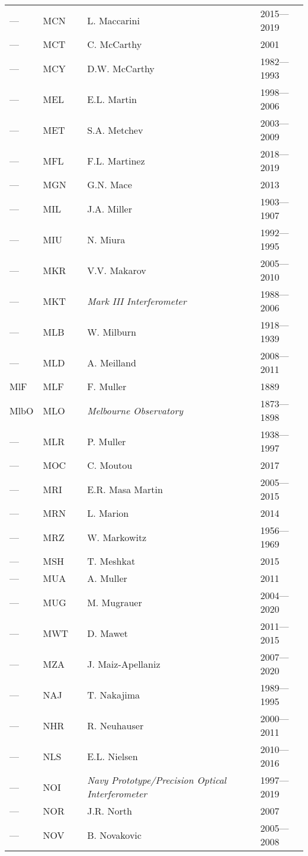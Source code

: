 \begin{longtable}{l|l|c|p{59mm}|l}
--- & MCN &   & L. Maccarini & 2015---2019 \\
--- & MCT &   & C. McCarthy & 2001 \\
--- & MCY &   & D.W. McCarthy & 1982---1993 \\
--- & MEL &   & E.L. Martin & 1998---2006 \\
--- & MET &   & S.A. Metchev & 2003---2009 \\
--- & MFL &   & F.L. Martinez & 2018---2019 \\
--- & MGN &   & G.N. Mace & 2013 \\
--- & MIL &   & J.A. Miller & 1903---1907 \\
--- & MIU &   & N. Miura & 1992---1995 \\
--- & MKR &   & V.V. Makarov & 2005---2010 \\
--- & MKT &   & \emph{Mark III Interferometer} & 1988---2006 \\
--- & MLB &   & W. Milburn & 1918---1939 \\
--- & MLD &   & A. Meilland & 2008---2011 \\
MlF & MLF &   & F. Muller & 1889 \\
MlbO & MLO &   & \emph{Melbourne Observatory} & 1873---1898 \\
--- & MLR &   & P. Muller & 1938---1997 \\
--- & MOC &   & C. Moutou & 2017 \\
--- & MRI &   & E.R. Masa Martin & 2005---2015 \\
--- & MRN &   & L. Marion & 2014 \\
--- & MRZ &   & W. Markowitz & 1956---1969 \\
--- & MSH &   & T. Meshkat & 2015 \\
--- & MUA &   & A. Muller & 2011 \\
--- & MUG &   & M. Mugrauer & 2004---2020 \\
--- & MWT &   & D. Mawet & 2011---2015 \\
--- & MZA &   & J. Maiz-Apellaniz & 2007---2020 \\\midrule
--- & NAJ &   & T. Nakajima & 1989---1995 \\
--- & NHR &   & R. Neuhauser & 2000---2011 \\
--- & NLS &   & E.L. Nielsen & 2010---2016 \\
--- & NOI &   & \emph{Navy Prototype/Precision Optical Interferometer} & 1997---2019 \\
--- & NOR &   & J.R. North & 2007 \\
--- & NOV &   & B. Novakovic & 2005---2008 \\

\end{longtable}
